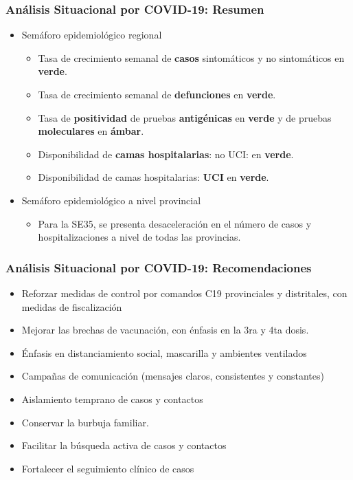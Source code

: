 \documentclass[xcolor=table]{beamer}
\begin{document}
\begin{frame}
	\frametitle{Análisis Situacional por COVID-19: Resumen}
	\vspace{-.5cm}
	\begin{itemize}
		\item Semáforo epidemiológico regional
		\begin{itemize}
			\item Tasa de crecimiento semanal de \textbf{\color{mycolor4}casos} sintomáticos y no sintomáticos en \textbf{\color{mycolor3}verde}.
			\item Tasa de crecimiento semanal de \textbf{\color{mycolor4}defunciones} en \textbf{\color{mycolor3}verde}.
			\item Tasa de \textbf{\color{mycolor4}positividad} de pruebas \textbf{\color{mycolor4}antigénicas} en \textbf{\color{mycolor3}verde} y de pruebas \textbf{\color{mycolor4}moleculares} en \textbf{\color{mycolor3}ámbar}.
			\item Disponibilidad de \textbf{\color{mycolor4}camas hospitalarias}: no UCI: en \textbf{\color{mycolor3}verde}.
			\item Disponibilidad de camas hospitalarias: \textbf{\color{mycolor4}UCI} en \textbf{\color{mycolor3}verde}.
		\end{itemize} 
		\item Semáforo epidemiológico a nivel provincial
		\begin{itemize}
			\item Para la SE35, se presenta desaceleración en el número de casos y hospitalizaciones a nivel de todas las provincias.
		\end{itemize}
	\end{itemize}
\end{frame}

\begin{frame}[label=recomendaciones]
	\frametitle{Análisis Situacional por COVID-19: Recomendaciones}
	\vspace{-.5cm}
	\begin{itemize}
			\item Reforzar medidas de control por comandos C19 provinciales y distritales, con medidas de fiscalización
			\item Mejorar las brechas de vacunación, con énfasis en la 3ra y 4ta dosis.
			\item Énfasis en distanciamiento social, mascarilla y ambientes ventilados
			\item Campañas de comunicación (mensajes claros, consistentes y constantes)
			\item Aislamiento temprano de casos y contactos
			\item Conservar la burbuja familiar. 
			\item Facilitar la búsqueda activa de casos y contactos
			\item Fortalecer el seguimiento clínico de casos			
	\end{itemize} 
\end{frame}
\end{document}
